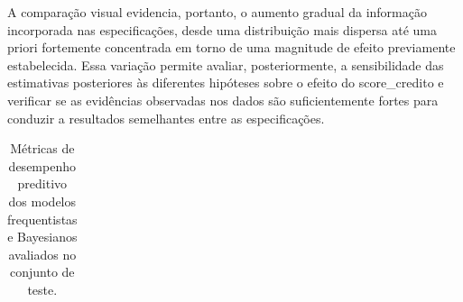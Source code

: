 \documentclass[
  brazilian,
  12pt,
  letterpaper,
  DIV=11,
  numbers=noendperiod]{scrartcl}
\begin{document}
A comparação visual evidencia, portanto, o aumento gradual da informação
incorporada nas especificações, desde uma distribuição mais dispersa até
uma priori fortemente concentrada em torno de uma magnitude de efeito
previamente estabelecida. Essa variação permite avaliar, posteriormente,
a sensibilidade das estimativas posteriores às diferentes hipóteses
sobre o efeito do score\_credito e verificar se as evidências observadas
nos dados são suficientemente fortes para conduzir a resultados
semelhantes entre as especificações.

{

\begin{longtable}[]{@{}
  >{\raggedright\arraybackslash}p{}
  >{\centering\arraybackslash}p{}
  >{\centering\arraybackslash}p{}
  >{\centering\arraybackslash}p{}
  >{\centering\arraybackslash}p{}
  >{\centering\arraybackslash}p{}
  >{\centering\arraybackslash}p{}
  >{\centering\arraybackslash}p{}
  >{\centering\arraybackslash}p{}
  >{\centering\arraybackslash}p{}@{}}

\caption{\label{tbl-metricas-modelos}Métricas de desempenho preditivo
dos modelos frequentistas e Bayesianos avaliados no conjunto de teste.}

\tabularnewline


\end{longtable}}
\end{document}
